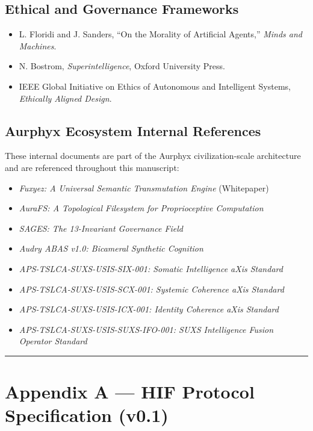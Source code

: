 \subsection*{Ethical and Governance Frameworks}

\begin{itemize}
\tightlist
\item L. Floridi and J. Sanders, ``On the Morality of Artificial Agents,'' \emph{Minds and Machines}.
\item N. Bostrom, \emph{Superintelligence}, Oxford University Press.
\item IEEE Global Initiative on Ethics of Autonomous and Intelligent Systems, \emph{Ethically Aligned Design}.
\end{itemize}

\subsection*{Aurphyx Ecosystem Internal References}

These internal documents are part of the Aurphyx civilization-scale architecture and are referenced throughout this manuscript:

\begin{itemize}
\tightlist
\item \emph{Fuxyez: A Universal Semantic Transmutation Engine} (Whitepaper)
\item \emph{AuraFS: A Topological Filesystem for Proprioceptive Computation}
\item \emph{SAGES: The 13-Invariant Governance Field}
\item \emph{Audry ABAS v1.0: Bicameral Synthetic Cognition}
\item \emph{APS-TSLCA-SUXS-USIS-SIX-001: Somatic Intelligence aXis Standard}
\item \emph{APS-TSLCA-SUXS-USIS-SCX-001: Systemic Coherence aXis Standard}
\item \emph{APS-TSLCA-SUXS-USIS-ICX-001: Identity Coherence aXis Standard}
\item \emph{APS-TSLCA-SUXS-USIS-SUXS-IFO-001: SUXS Intelligence Fusion Operator Standard}
\end{itemize}

\begin{center}\rule{0.5\linewidth}{0.5pt}\end{center}

\section{Appendix A --- HIF Protocol Specification (v0.1)}\label{appendix-a-hif-protocol-specification-v0.1}

